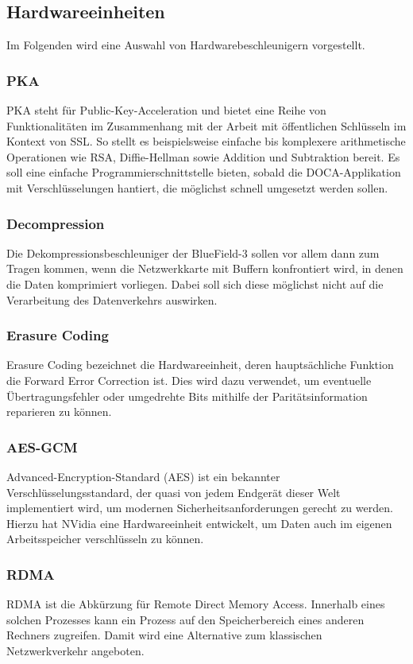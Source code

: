 \subsection{Hardwareeinheiten}
Im Folgenden wird eine Auswahl von Hardwarebeschleunigern vorgestellt.
\subsubsection{PKA}
PKA steht für Public-Key-Acceleration und bietet eine Reihe von Funktionalitäten im Zusammenhang mit der Arbeit mit öffentlichen Schlüsseln im Kontext von SSL. So stellt es beispielsweise einfache bis komplexere arithmetische Operationen wie RSA, Diffie-Hellman sowie Addition und Subtraktion bereit. Es soll eine einfache Programmierschnittstelle bieten, sobald die DOCA-Applikation mit Verschlüsselungen hantiert, die möglichst schnell umgesetzt werden sollen.
\subsubsection{Decompression}
Die Dekompressionsbeschleuniger der BlueField-3 sollen vor allem dann zum Tragen kommen, wenn die Netzwerkkarte mit Buffern konfrontiert wird, in denen die Daten komprimiert vorliegen. Dabei soll sich diese möglichst nicht auf die Verarbeitung des Datenverkehrs auswirken.
\subsubsection{Erasure Coding}
Erasure Coding bezeichnet die Hardwareeinheit, deren hauptsächliche Funktion die Forward Error Correction ist. Dies wird dazu verwendet, um eventuelle Übertragungsfehler oder umgedrehte Bits mithilfe der Paritätsinformation reparieren zu können.
\subsubsection{AES-GCM}
Advanced-Encryption-Standard (AES) ist ein bekannter Verschlüsselungsstandard, der quasi von jedem Endgerät dieser Welt implementiert wird, um modernen Sicherheitsanforderungen gerecht zu werden. Hierzu hat NVidia eine Hardwareeinheit entwickelt, um Daten auch im eigenen Arbeitsspeicher verschlüsseln zu können.
\subsubsection{RDMA}
RDMA ist die Abkürzung für Remote Direct Memory Access. Innerhalb eines solchen Prozesses kann ein Prozess auf den Speicherbereich eines anderen Rechners zugreifen. Damit wird eine Alternative zum klassischen Netzwerkverkehr angeboten.
